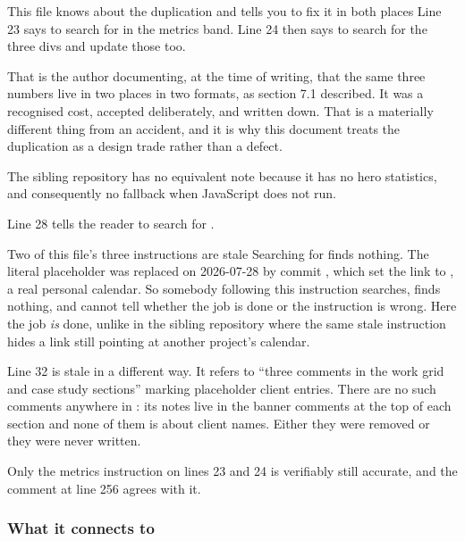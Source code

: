 \begin{keyidea}{This file knows about the duplication and tells you to fix it in
both places}
Line 23 says to search for  in the metrics band. Line 24 then says
to search for the three  divs and update those too.

That is the author documenting, at the time of writing, that the same three numbers
live in two places in two formats, as section 7.1 described. It was a recognised
cost, accepted deliberately, and written down. That is a materially different thing
from an accident, and it is why this document treats the duplication as a design
trade rather than a defect.

The sibling repository has no equivalent note because it has no hero statistics, and
consequently no fallback when JavaScript does not run.
\end{keyidea}

Line 28 tells the reader to search for .

\begin{honest}{Two of this file's three instructions are stale}
Searching  for  finds nothing. The literal
placeholder was replaced on 2026-07-28 by commit , which set the link
to , a real personal calendar. So somebody
following this instruction searches, finds nothing, and cannot tell whether the job
is done or the instruction is wrong. Here the job \emph{is} done, unlike in the
sibling repository where the same stale instruction hides a link still pointing at
another project's calendar.

Line 32 is stale in a different way. It refers to ``three 
comments in the work grid and case study sections'' marking placeholder client
entries. There are no such comments anywhere in : its
 notes live in the banner comments at the top of each section and none
of them is about client names. Either they were removed or they were never written.

Only the metrics instruction on lines 23 and 24 is verifiably still accurate, and
the  comment at  line 256 agrees with it.
\end{honest}

\subsubsection*{What it connects to}

